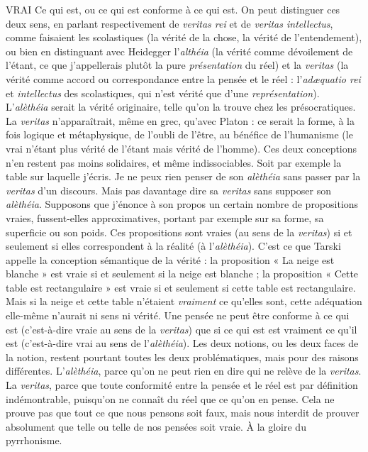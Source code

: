 VRAI Ce qui est, ou ce qui est conforme à ce qui est. On peut distinguer ces
deux sens, en parlant respectivement de {\it veritas rei} et de {\it veritas intellectus},
comme faisaient les scolastiques (la vérité de la chose, la vérité de l’entendement),
ou bien en distinguant avec Heidegger l’{\it althéia} (la vérité comme
dévoilement de l’étant, ce que j’appellerais plutôt la pure {\it présentation} du réel)
et la {\it veritas} (la vérité comme accord ou correspondance entre la pensée et le
réel : l’{\it ad{\ae}quatio rei} et {\it intellectus} des scolastiques, qui n’est vérité que d’une
{\it représentation}). L'{\it alèthéia} serait la vérité originaire, telle qu’on la trouve chez les
présocratiques. La {\it veritas} n’apparaîtrait, même en grec, qu'avec Platon : ce
serait la forme, à la fois logique et métaphysique, de l'oubli de l’être, au bénéfice
de l’humanisme (le vrai n'étant plus vérité de l’étant mais vérité de
l’homme). Ces deux conceptions n’en restent pas moins solidaires, et même
indissociables. Soit par exemple la table sur laquelle j'écris. Je ne peux rien
penser de son {\it alèthéia} sans passer par la {\it veritas} d’un discours. Mais pas davantage
dire sa {\it veritas} sans supposer son {\it alèthéia}. Supposons que j'énonce à son
propos un certain nombre de propositions vraies, fussent-elles approximatives,
portant par exemple sur sa forme, sa superficie ou son poids. Ces propositions
sont vraies (au sens de la {\it veritas}) si et seulement si elles correspondent à la réalité
(à l'{\it alèthéia}). C’est ce que Tarski appelle la conception sémantique de la
vérité : la proposition « La neige est blanche » est vraie si et seulement si la
neige est blanche ; la proposition « Cette table est rectangulaire » est vraie si et
seulement si cette table est rectangulaire. Mais si la neige et cette table n’étaient
{\it vraiment} ce qu'elles sont, cette adéquation elle-même n’aurait ni sens ni vérité.
Une pensée ne peut être conforme à ce qui est (c’est-à-dire vraie au sens de la
{\it veritas}) que si ce qui est est vraiment ce qu'il est (c’est-à-dire vrai au sens de
l’{\it alèthéia}). Les deux notions, ou les deux faces de la notion, restent pourtant
toutes les deux problématiques, mais pour des raisons différentes. L’{\it alèthéia},
parce qu’on ne peut rien en dire qui ne relève de la {\it veritas}. La {\it veritas}, parce que
toute conformité entre la pensée et le réel est par définition indémontrable,
puisqu’on ne connaît du réel que ce qu’on en pense. Cela ne prouve pas que
tout ce que nous pensons soit faux, mais nous interdit de prouver absolument
que telle ou telle de nos pensées soit vraie. À la gloire du pyrrhonisme.

